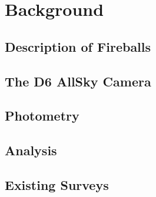 \chapter{Background}

\section{Description of Fireballs}













\section{The D6 AllSky Camera}













\section{Photometry}













\section{Analysis}













\section{Existing Surveys}
